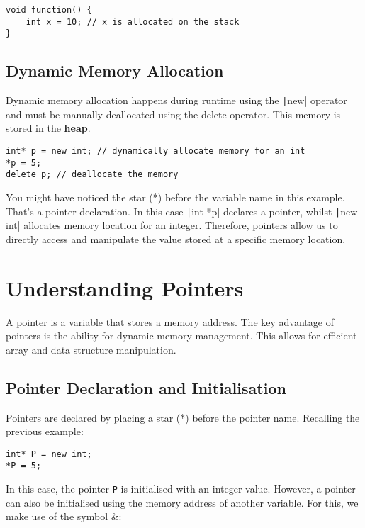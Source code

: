 \documentclass{article}
\begin{document}
\begin{verbatim}
void function() {
    int x = 10; // x is allocated on the stack
}
\end{verbatim}

\subsection{Dynamic Memory Allocation}
Dynamic memory allocation happens during runtime using the \texttt|new| operator and must be manually deallocated using the delete operator. This memory is stored in the \textbf{heap}.

\begin{verbatim}
int* p = new int; // dynamically allocate memory for an int
*p = 5;
delete p; // deallocate the memory
\end{verbatim}

You might have noticed the star (*) before the variable name in this example. That's a pointer declaration.
In this case \texttt|int *p| declares a pointer, whilst \texttt|new int| allocates memory location for an integer. Therefore, pointers allow us to directly access and manipulate the value stored at a specific memory location.

\section{Understanding Pointers}
A pointer is a variable that stores a memory address. The key advantage of pointers is the ability for dynamic memory management. This allows for efficient array and data structure manipulation.

\subsection{Pointer Declaration and Initialisation}
Pointers are declared by placing a star (*) before the pointer name. Recalling the previous example:

\begin{verbatim}
int* P = new int;
*P = 5;
\end{verbatim}

In this case, the pointer \verb|P| is initialised with an integer value. However, a pointer can also be initialised using the memory address of another variable. For this, we make use of the symbol \&:
\end{document}
